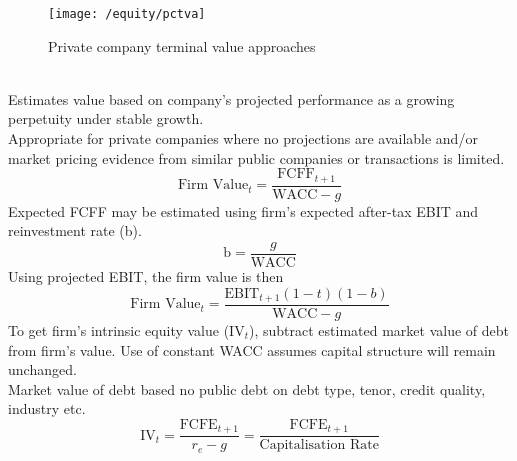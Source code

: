 \begin{figure}[H]
\centering
\texttt{[image: /equity/pctva]}
\caption{Private company terminal value approaches}
\end{figure}

\begin{method} \\
Estimates value based on company's projected performance as a growing perpetuity under stable growth.\\
Appropriate for private companies where no projections are available and/or market pricing evidence from similar public companies or transactions is limited.
\begin{equation}
\text{Firm Value}_t = \frac{\text{FCFF}_{t+1}}{\text{WACC} - g} \nonumber
\end{equation}
Expected FCFF may be estimated using firm's expected after-tax EBIT and reinvestment rate (b).
\begin{equation}
\text{b} = \frac{g}{\text{WACC}} \nonumber
\end{equation} 
Using projected EBIT, the firm value is then
\begin{equation}
\text{Firm Value}_t = \frac{\text{EBIT}_{t+1}(1-t)(1-b)}{\text{WACC}-g} \nonumber
\end{equation}
To get firm's intrinsic equity value (IV$_{t}$), subtract estimated market value of debt from firm's value. Use of constant WACC assumes capital structure will remain unchanged.\\
Market value of debt based no public debt on debt type, tenor, credit quality, industry etc.
\begin{equation}
\text{IV}_t = \frac{\text{FCFE}_{t+1}}{r_e - g} = \frac{\text{FCFE}_{t+1}}{\text{Capitalisation Rate}} \nonumber
\end{equation}
\end{method}

